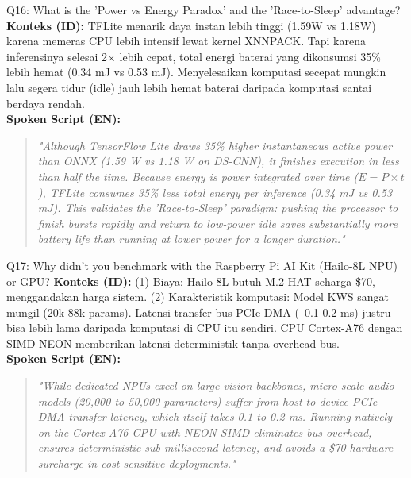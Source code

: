 \documentclass[11pt,a4paper]{article}
\begin{document}
\begin{hardbox}{Q16: What is the 'Power vs Energy Paradox' and the 'Race-to-Sleep' advantage?}
\textbf{Konteks (ID):} TFLite menarik daya instan lebih tinggi (1.59W vs 1.18W) karena memeras CPU lebih intensif lewat kernel XNNPACK. Tapi karena inferensinya selesai 2$\times$ lebih cepat, total energi baterai yang dikonsumsi 35\% lebih hemat (0.34 mJ vs 0.53 mJ). Menyelesaikan komputasi secepat mungkin lalu segera tidur (idle) jauh lebih hemat baterai daripada komputasi santai berdaya rendah.\\
\textbf{Spoken Script (EN):}
\begin{quote}
\small
\textit{"Although TensorFlow Lite draws 35\% higher instantaneous active power than ONNX (1.59 W vs 1.18 W on DS-CNN), it finishes execution in less than half the time. Because energy is power integrated over time ($E = P \times t$), TFLite consumes 35\% less total energy per inference (0.34 mJ vs 0.53 mJ). This validates the 'Race-to-Sleep' paradigm: pushing the processor to finish bursts rapidly and return to low-power idle saves substantially more battery life than running at lower power for a longer duration."}
\end{quote}
\end{hardbox}

\begin{hardbox}{Q17: Why didn't you benchmark with the Raspberry Pi AI Kit (Hailo-8L NPU) or GPU?}
\textbf{Konteks (ID):} (1) Biaya: Hailo-8L butuh M.2 HAT seharga \$70, menggandakan harga sistem. (2) Karakteristik komputasi: Model KWS sangat mungil (20k-88k params). Latensi transfer bus PCIe DMA (~0.1-0.2 ms) justru bisa lebih lama daripada komputasi di CPU itu sendiri. CPU Cortex-A76 dengan SIMD NEON memberikan latensi deterministik tanpa overhead bus.\\
\textbf{Spoken Script (EN):}
\begin{quote}
\small
\textit{"While dedicated NPUs excel on large vision backbones, micro-scale audio models (20,000 to 50,000 parameters) suffer from host-to-device PCIe DMA transfer latency, which itself takes 0.1 to 0.2 ms. Running natively on the Cortex-A76 CPU with NEON SIMD eliminates bus overhead, ensures deterministic sub-millisecond latency, and avoids a \$70 hardware surcharge in cost-sensitive deployments."}
\end{quote}
\end{hardbox}
\end{document}
